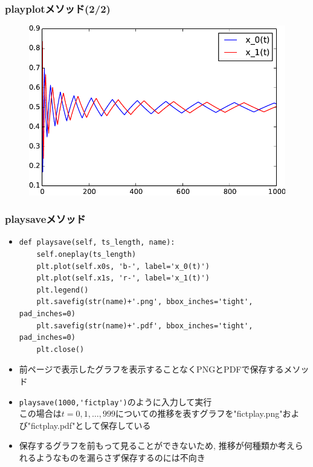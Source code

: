 \documentclass[dvipdfmx,fleqn,handout]{beamer}
\begin{document}
\begin{frame}
\frametitle{playplotメソッド(2/2)}
\begin{figure}
 \centering
 \includegraphics[width=\linewidth]{oneplay2.pdf}
 \label{fig:matchingpennies_plot}
\end{figure}
\end{frame}

\begin{frame}[fragile]%
\frametitle{playsaveメソッド}
\begin{itemize}\setlength{\parskip}{0.5em}
\item
\scriptsize
\begin{verbatim} 
def playsave(self, ts_length, name):
    self.oneplay(ts_length)
    plt.plot(self.x0s, 'b-', label='x_0(t)')
    plt.plot(self.x1s, 'r-', label='x_1(t)')
    plt.legend()
    plt.savefig(str(name)+'.png', bbox_inches='tight', pad_inches=0)
    plt.savefig(str(name)+'.pdf', bbox_inches='tight', pad_inches=0)
    plt.close()
\end{verbatim}
\normalsize
\pause
\item
前ページで表示したグラフを表示することなくPNGとPDFで保存するメソッド\pause
\item
\verb|playsave(1000,'fictplay')|のように入力して実行\pause\\
この場合は$t=0,1,\dots,999$についての推移を表すグラフを"fictplay.png"および"fictplay.pdf"として保存している\pause
\item
保存するグラフを前もって見ることができないため, 推移が何種類か考えられるようなものを漏らさず保存するのには不向き\pause\\
\end{itemize}
\end{frame}
\end{document}
